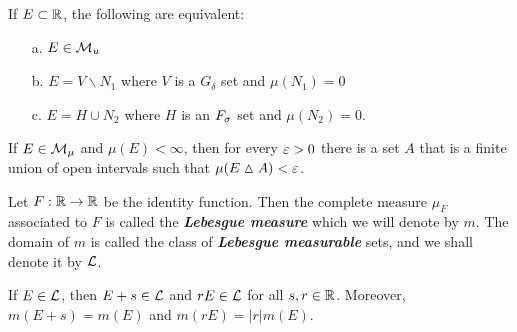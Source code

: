 \vs 

\begin{thm}
If $E\subset \mathbb{R}$, the following are equivalent:
\begin{enumerate}
\item[a.] $E\in \mathcal{M}_u$
\item[b.] $E = V\backslash N_1$ where $V$ is a $G_\delta$ set and $\mu(N_1) = 0$
\item[c.] $E = H\cup N_2$ where $H$ is an $F_\sigma$ set and $\mu(N_2) = 0$.
\end{enumerate}
\end{thm}

\vs 

\begin{prop}
If $E\in \mathcal{M}_\mu$ and $\mu(E) < \infty$, then for every $\varepsilon > 0$ there is a set $A$ that is a finite union of open intervals such that $\mu(E\vartriangle A) < \varepsilon$.
\end{prop}

\vs 

\dfn Let $F:\mathbb{R}\rightarrow \mathbb{R}$ be the identity function. Then the complete measure $\mu_F$ associated to $F$ is called the \textit{\textbf{Lebesgue measure}} which we will denote by $m$. The domain of $m$ is called the class of \textbf{\textit{Lebesgue measurable}} sets, and we shall denote it by $\mathcal{L}$.


\vs

\begin{thm}
If $E\in \mathcal{L}$, then $E + s\in \mathcal{L}$ and $rE\in \mathcal{L}$ for all $s,r\in \mathbb{R}$. Moreover, $m(E + s) = m(E)$ and $m(rE) = |r|m(E).$
\end{thm}



















